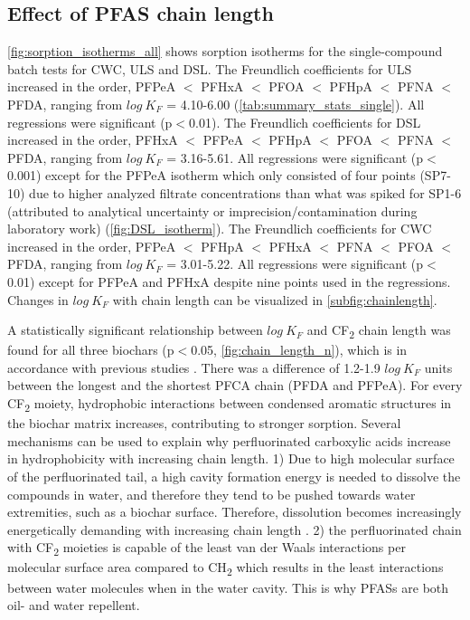 \subsection{Effect of PFAS chain length}
\cref{fig:sorption_isotherms_all} shows sorption isotherms for the single-compound batch tests for CWC, ULS and DSL. The Freundlich coefficients for ULS increased in the order, PFPeA $<$ PFHxA $<$ PFOA $<$ PFHpA $<$ PFNA $<$ PFDA, ranging from $log~K_F$ = 4.10-6.00 (\cref{tab:summary_stats_single}). All regressions were significant (p$<$0.01). The Freundlich coefficients for DSL increased in the order, PFHxA $<$ PFPeA $<$ PFHpA $<$ PFOA $<$ PFNA $<$ PFDA, ranging from $log~K_F$ = 3.16-5.61. All regressions were significant (p$<$0.001) except for the PFPeA isotherm which only consisted of four points (SP7-10) due to higher analyzed filtrate concentrations than what was spiked for SP1-6 (attributed to analytical uncertainty or imprecision/contamination during laboratory work) (\cref{fig:DSL_isotherm}). The Freundlich coefficients for CWC increased in the order, PFPeA $<$ PFHpA $<$ PFHxA $<$ PFNA $<$ PFOA $<$ PFDA, ranging from $log~K_F$ = 3.01-5.22. All regressions were significant (p$<$0.01) except for PFPeA and PFHxA despite nine points used in the regressions. Changes in $log~K_F$ with chain length can be visualized in \cref{subfig:chainlength}. 

A statistically significant relationship between $log~K_F$ and CF\textsubscript{2} chain length was found for all three biochars (p$<$0.05, \cref{fig:chain_length_n}), which is in accordance with previous studies \citep{Sorengard2019,higgins2006sorption,ahmed2020per}. There was a difference of 1.2-1.9 $log~K_F$ units between the longest and the shortest PFCA chain (PFDA and PFPeA). For every CF\textsubscript{2} moiety, hydrophobic interactions between condensed aromatic structures in the biochar matrix increases, contributing to stronger sorption. Several mechanisms can be used to explain why perfluorinated carboxylic acids increase in hydrophobicity with increasing chain length. 1) Due to high molecular surface of the perfluorinated tail, a high cavity formation energy is needed to dissolve the compounds in water, and therefore they tend to be pushed towards water extremities, such as a biochar surface. Therefore, dissolution becomes increasingly energetically demanding with increasing chain length \citep{sigmund2022sorption}. 2) the perfluorinated chain with CF\textsubscript{2} moieties is capable of the least van der Waals interactions per molecular surface area compared to CH\textsubscript{2} which results in the least interactions between water molecules when in the water cavity. This is why PFASs are both oil- and water repellent. 


